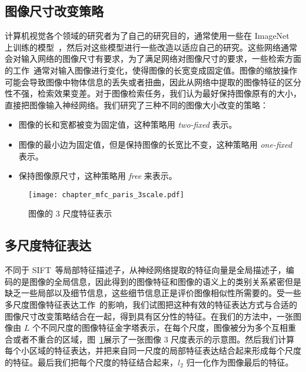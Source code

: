 \subsection{图像尺寸改变策略}\label{subsec:img_resize_strategy}
计算机视觉各个领域的研究者为了自己的研究目的，通常使用一些在 ImageNet~\cite{Russakovsky2015ImageNetLS} 上训练的模型~\cite{Krizhevsky2012ImageNetCW,Simonyan2014VeryDC,Szegedy2015GoingDW,He2016DeepRL}，然后对这些模型进行一些改造以适应自己的研究。这些网络通常会对输入网络的图像尺寸有要求，为了满足网络对图像尺寸的要求，一些检索方面的工作~\cite{Gong2014MultiscaleOP,Babenko2015AggregatingLD}通常对输入图像进行变化，使得图像的长宽变成固定值。图像的缩放操作可能会导致图像中物体信息的丢失或者扭曲，因此从网络中提取的图像特征的区分性不强，检索效果变差。对于图像检索任务，我们认为最好保持图像原有的大小，直接把图像输入神经网络。我们研究了三种不同的图像大小改变的策略：
\begin{itemize}
\item 图像的长和宽都被变为固定值，这种策略用 \emph{two-fixed} 表示。

\item 图像的最小边为固定值，但是保持图像的长宽比不变，这种策略用 \emph{one-fixed} 表示。

\item 保持图像原尺寸，这种策略用 \emph{free} 来表示。
\end{itemize}

\begin{figure}[!t]
	\centering
	\texttt{[image: chapter\_mfc\_paris\_3scale.pdf]}
	\caption{图像的 3 尺度特征表示}
	\label{fig:img_multiscale_feature}
\end{figure}

\subsection{多尺度特征表达}\label{subsec:multiscale_img_repr}
不同于 SIFT~\cite{Lowe2004DistinctiveIF}等局部特征描述子，从神经网络提取的特征向量是全局描述子，编码的是图像的全局信息，因此得到的图像特征和图像的语义上的类别关系紧密但是缺乏一些局部以及细节信息，这些细节信息正是评价图像相似性所需要的。受一些多尺度图像特征表达工作~\cite{Lazebnik2006BeyondBO,He2014SpatialPP}的影响，我们试图把这种有效的特征表达方式与合适的图像尺寸改变策略结合在一起，得到具有区分性的特征。在我们的方法中，一张图像由 $L$ 个不同尺度的图像特征金字塔表示，在每个尺度，图像被分为多个互相重合或者不重合的区域，图~\ref{fig:img_multiscale_feature}展示了一张图像 3 尺度表示的示意图。然后我们计算每个小区域的特征表达，并把来自同一尺度的局部特征表达结合起来形成每个尺度的特征。最后我们把每个尺度的特征结合起来，$l_2$ 归一化作为图像最后的特征。

